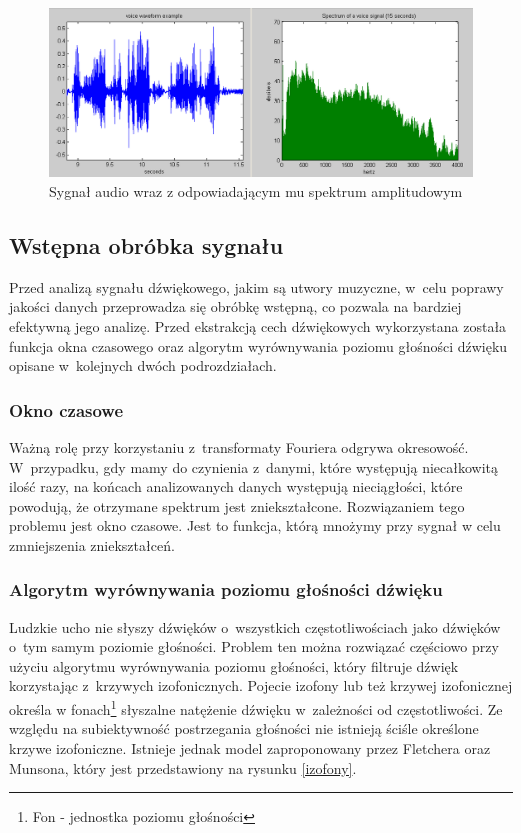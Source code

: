 \begin{figure}[ht!]
\centering
\includegraphics[scale=0.5]{res/spectrumExample.png}
\caption[Caption for LOF]{Sygnał audio wraz z odpowiadającym mu spektrum amplitudowym\label{spectrumExample} \footnotemark}
\end{figure}




\subsection{Wstępna obróbka sygnału}
Przed analizą sygnału dźwiękowego, jakim są utwory muzyczne, w~celu poprawy jakości danych przeprowadza się obróbkę wstępną, co pozwala na bardziej efektywną jego analizę. Przed ekstrakcją cech dźwiękowych wykorzystana została funkcja okna czasowego oraz algorytm wyrównywania poziomu głośności dźwięku opisane w~kolejnych dwóch podrozdziałach.

\subsubsection{Okno czasowe}
Ważną rolę przy korzystaniu z~transformaty Fouriera odgrywa okresowość. W~przypadku, gdy mamy do czynienia z~danymi, które występują niecałkowitą ilość razy, na końcach analizowanych danych występują nieciągłości, które powodują, że otrzymane spektrum jest zniekształcone. Rozwiązaniem tego problemu jest okno czasowe. Jest to funkcja, którą mnożymy przy sygnał w celu zmniejszenia zniekształceń\cite{windowingNI}. 

\subsubsection{Algorytm wyrównywania poziomu głośności dźwięku}
Ludzkie ucho nie słyszy dźwięków o~wszystkich częstotliwościach jako dźwięków o~tym samym poziomie głośności. Problem ten można rozwiązać częściowo przy użyciu algorytmu wyrównywania poziomu głośności, który filtruje dźwięk korzystając z~krzywych izofonicznych. Pojecie izofony lub też krzywej izofonicznej określa w fonach\footnote{Fon - jednostka poziomu głośności} słyszalne natężenie dźwięku w~zależności od częstotliwości\cite{izofona}. Ze względu na subiektywność postrzegania głośności nie istnieją ściśle określone krzywe izofoniczne. Istnieje jednak model zaproponowany przez Fletchera oraz Munsona\cite{izofonyModel}, który jest przedstawiony na rysunku \ref{izofony}.


